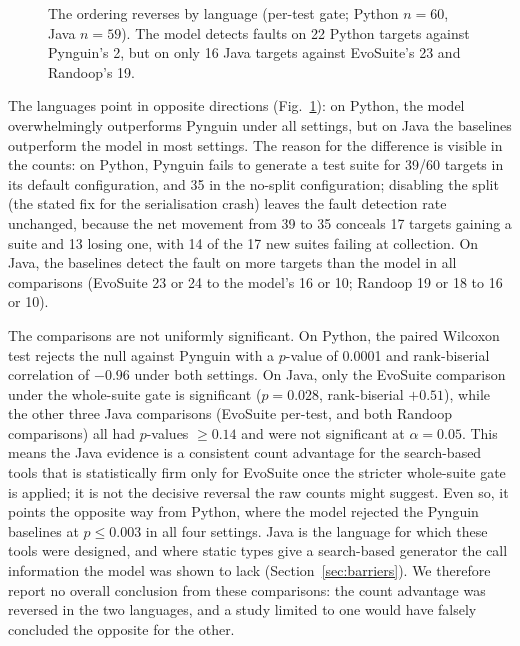 \begin{figure}[t]
\centering

\caption{The ordering reverses by language (per-test gate; Python $n=60$, Java $n=59$). The
model detects faults on 22 Python targets against Pynguin's 2, but on only 16 Java targets
against EvoSuite's 23 and Randoop's 19.}
\label{fig:rqc}
\end{figure}

The languages point in opposite directions (Fig.~\ref{fig:rqc}): on Python, the model
overwhelmingly outperforms Pynguin under all settings, but on Java the baselines outperform
the model in most settings.
The reason for the difference is visible in the counts: on Python, Pynguin fails to generate a
test suite for 39/60 targets in its default configuration, and 35 in the no-split
configuration; disabling the split (the stated fix for the serialisation crash) leaves the
fault detection rate unchanged, because the net movement from 39 to 35 conceals 17 targets
gaining a suite and 13 losing one, with 14 of the 17 new suites failing at collection. On
Java, the baselines detect the fault on more targets than the model in all comparisons
(EvoSuite 23 or 24 to the model's 16 or 10; Randoop 19 or 18 to 16 or 10).

The comparisons are not uniformly significant. On Python, the paired Wilcoxon test rejects the
null against Pynguin with a $p$-value of 0.0001 and rank-biserial correlation of $-0.96$ under
both settings. On Java, only the EvoSuite comparison under the whole-suite gate is significant
($p = 0.028$, rank-biserial $+0.51$), while the other three Java comparisons (EvoSuite
per-test, and both Randoop comparisons) all had $p$-values $\ge 0.14$ and were not significant
at $\alpha = 0.05$. This means the Java evidence is a consistent count advantage for the
search-based tools that is statistically firm only for EvoSuite once the stricter whole-suite
gate is applied; it is not the decisive reversal the raw counts might suggest. Even so, it
points the opposite way from Python, where the model rejected the Pynguin baselines at
$p \le 0.003$ in all four settings. Java is the language for which these tools were designed,
and where static types give a search-based generator the call information the model was shown
to lack (Section~\ref{sec:barriers}). We therefore report no overall conclusion from these
comparisons: the count advantage was reversed in the two languages, and a study limited to one
would have falsely concluded the opposite for the other.

